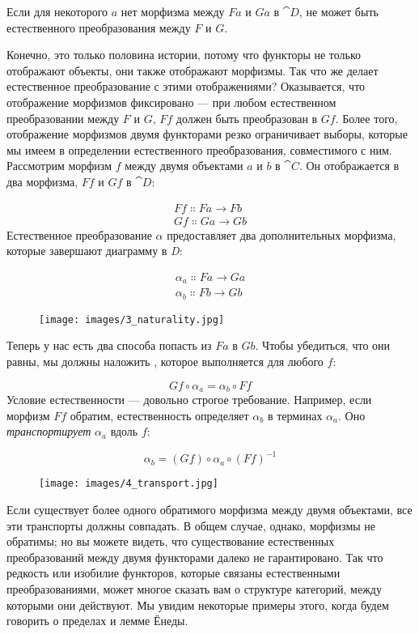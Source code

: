 Если для некоторого $a$ нет морфизма между $F a$ и
$G a$ в $\cat{D}$, не может быть естественного преобразования
между $F$ и $G$.

Конечно, это только половина истории, потому что функторы не только отображают
объекты, они также отображают морфизмы. Так что же делает естественное
преобразование с этими отображениями? Оказывается, что отображение
морфизмов фиксировано --- при любом естественном преобразовании между $F$ и $G$,
$F f$ должен быть преобразован в $G f$. Более того,
отображение морфизмов двумя функторами резко ограничивает
выборы, которые мы имеем в определении естественного преобразования, совместимого
с ним. Рассмотрим морфизм $f$ между двумя объектами $a$
и $b$ в $\cat{C}$. Он отображается в два морфизма, $F f$
и $G f$ в $\cat{D}$:

\begin{gather*}
  F f \Colon F a \to F b \\
  G f \Colon G a \to G b
\end{gather*}
Естественное преобразование $\alpha$ предоставляет два дополнительных морфизма,
которые завершают диаграмму в \emph{D}:

\begin{gather*}
  \alpha_a \Colon F a \to G a \\
  \alpha_b \Colon F b \to G b
\end{gather*}

\begin{figure}[H]
  \centering
  \texttt{[image: images/3\_naturality.jpg]}
\end{figure}

\noindent
Теперь у нас есть два способа попасть из $F a$ в $G b$. Чтобы
убедиться, что они равны, мы должны наложить ,
которое выполняется для любого $f$:

\[G f \circ \alpha_a = \alpha_b \circ F f\]
Условие естественности --- довольно строгое требование. Например,
если морфизм $F f$ обратим, естественность
определяет $\alpha_b$ в терминах $\alpha_a$. Оно \emph{транспортирует}
$\alpha_a$ вдоль $f$:

\[\alpha_b = (G f) \circ \alpha_a \circ (F f)^{-1}\]

\begin{figure}[H]
  \centering
  \texttt{[image: images/4\_transport.jpg]}
\end{figure}

\noindent
Если существует более одного обратимого морфизма между двумя объектами, все
эти транспорты должны совпадать. В общем случае, однако, морфизмы не
обратимы; но вы можете видеть, что существование естественных
преобразований между двумя функторами далеко не гарантировано. Так что
редкость или изобилие функторов, которые связаны естественными
преобразованиями, может многое сказать вам о структуре категорий,
между которыми они действуют. Мы увидим некоторые примеры этого, когда будем говорить
о пределах и лемме Ёнеды.

